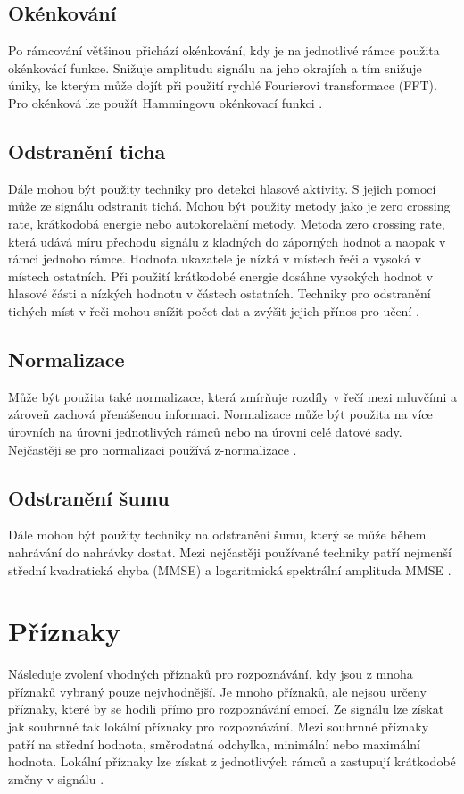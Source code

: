 \documentclass[FM,BP]{tulthesis}
\begin{document}
\subsection{Okénkování}
Po rámcování většinou přichází okénkování, kdy je na jednotlivé rámce použita okénkovácí funkce. Snižuje amplitudu signálu na jeho okrajích a tím snižuje úniky, ke kterým může dojít při použití rychlé Fourierovi transformace (FFT). Pro okénková lze použít Hammingovu okénkovací funkci \cite{DBLP:journals/speech/AkcayO20}.

\subsection{Odstranění ticha}
Dále mohou být použity techniky pro detekci hlasové aktivity. S jejich pomocí může ze signálu odstranit tichá. Mohou být použity metody jako je zero crossing rate, krátkodobá energie nebo autokorelační metody. Metoda zero crossing rate, která udává míru přechodu signálu z kladných do záporných hodnot a naopak v rámci jednoho rámce. Hodnota ukazatele je nízká v místech řeči a vysoká v místech ostatních. Při použití krátkodobé energie dosáhne vysokých hodnot v hlasové části a nízkých hodnotu v částech ostatních. Techniky pro odstranění tichých míst v řeči mohou snížit počet dat a zvýšit jejich přínos pro učení \cite{DBLP:journals/speech/AkcayO20}.

\subsection{Normalizace}
Může být použita také normalizace, která zmírňuje rozdíly v řečí mezi mluvčími a zároveň zachová přenášenou informaci. Normalizace může být použita na více úrovních na úrovni jednotlivých rámců nebo na úrovni celé datové sady. Nejčastěji se pro normalizaci používá z-normalizace \cite{DBLP:journals/speech/AkcayO20}.

\subsection{Odstranění šumu}
Dále mohou být použity techniky na odstranění šumu, který se může během nahrávání do nahrávky dostat. Mezi nejčastěji používané techniky patří nejmenší střední kvadratická chyba (MMSE) a logaritmická spektrální amplituda MMSE \cite{DBLP:journals/speech/AkcayO20}.

\section{Příznaky}
Následuje zvolení vhodných příznaků pro rozpoznávání, kdy jsou z mnoha příznaků vybraný pouze nejvhodnější. Je mnoho příznaků, ale nejsou určeny příznaky, které by se hodili přímo pro rozpoznávání emocí. Ze signálu lze získat jak souhrnné tak lokální příznaky pro rozpoznávání. Mezi souhrnné  příznaky patří na střední hodnota, směrodatná odchylka, minimální nebo maximální hodnota. Lokální příznaky lze získat z jednotlivých rámců a zastupují krátkodobé změny v signálu \cite{DBLP:journals/speech/AkcayO20}.
\end{document}
